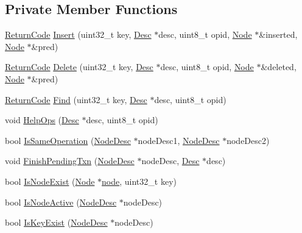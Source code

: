 \subsection*{Private Member Functions}
\begin{DoxyCompactItemize}
\item 
\hyperlink{classTransList_a038a4c9ca7ab3f2fb94f6fa4b2ba267f}{Return\-Code} \hyperlink{classTransList_a5ace06b8defeb2501a9607fc8fdec5f0}{Insert} (uint32\-\_\-t key, \hyperlink{structTransList_1_1Desc}{Desc} $\ast$desc, uint8\-\_\-t opid, \hyperlink{structTransList_1_1Node}{Node} $\ast$\&inserted, \hyperlink{structTransList_1_1Node}{Node} $\ast$\&pred)
\item 
\hyperlink{classTransList_a038a4c9ca7ab3f2fb94f6fa4b2ba267f}{Return\-Code} \hyperlink{classTransList_ae48aacff3239bd5b85749631c2ac271a}{Delete} (uint32\-\_\-t key, \hyperlink{structTransList_1_1Desc}{Desc} $\ast$desc, uint8\-\_\-t opid, \hyperlink{structTransList_1_1Node}{Node} $\ast$\&deleted, \hyperlink{structTransList_1_1Node}{Node} $\ast$\&pred)
\item 
\hyperlink{classTransList_a038a4c9ca7ab3f2fb94f6fa4b2ba267f}{Return\-Code} \hyperlink{classTransList_ab75389528ee7e0773ac0fe9c00351670}{Find} (uint32\-\_\-t key, \hyperlink{structTransList_1_1Desc}{Desc} $\ast$desc, uint8\-\_\-t opid)
\item 
void \hyperlink{classTransList_aa7e67c5ff8aeadc6d1d7791a297a58c4}{Help\-Ops} (\hyperlink{structTransList_1_1Desc}{Desc} $\ast$desc, uint8\-\_\-t opid)
\item 
bool \hyperlink{classTransList_a43cd23404964da4642819074b68459a5}{Is\-Same\-Operation} (\hyperlink{structTransList_1_1NodeDesc}{Node\-Desc} $\ast$node\-Desc1, \hyperlink{structTransList_1_1NodeDesc}{Node\-Desc} $\ast$node\-Desc2)
\item 
void \hyperlink{classTransList_a7ed667a308f2f7422dde28c7fe40cdc7}{Finish\-Pending\-Txn} (\hyperlink{structTransList_1_1NodeDesc}{Node\-Desc} $\ast$node\-Desc, \hyperlink{structTransList_1_1Desc}{Desc} $\ast$desc)
\item 
bool \hyperlink{classTransList_a6154ae0491b3194b51194694a182b2e4}{Is\-Node\-Exist} (\hyperlink{structTransList_1_1Node}{Node} $\ast$\hyperlink{structnode}{node}, uint32\-\_\-t key)
\item 
bool \hyperlink{classTransList_a153541a58266143ebb08963d3c955952}{Is\-Node\-Active} (\hyperlink{structTransList_1_1NodeDesc}{Node\-Desc} $\ast$node\-Desc)
\item 
bool \hyperlink{classTransList_a83d76bc637fa7e3b9e705d7792e949ed}{Is\-Key\-Exist} (\hyperlink{structTransList_1_1NodeDesc}{Node\-Desc} $\ast$node\-Desc)

\end{DoxyCompactItemize}
